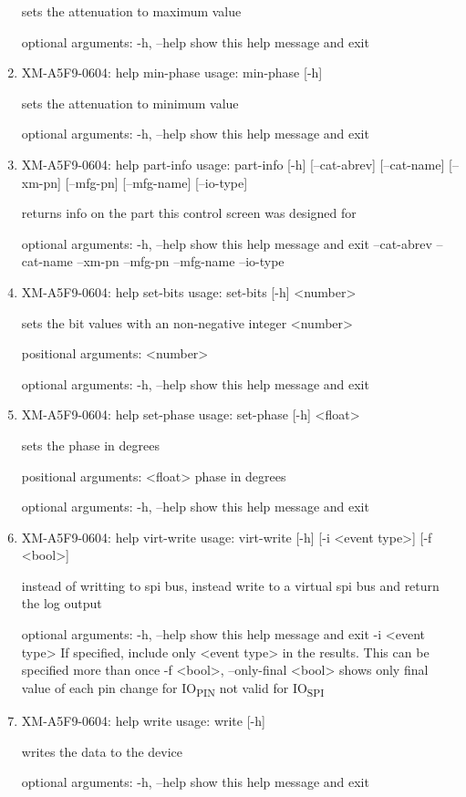 \documentclass[11pt]{article}
\begin{document}
\begin{enumerate}
sets the attenuation to maximum value

optional arguments:
  -h, --help  show this help message and exit

\item XM-A5F9-0604: help min-phase
\label{sec:orgd9fe8ba}
usage: min-phase [-h]

sets the attenuation to minimum value

optional arguments:
  -h, --help  show this help message and exit

\item XM-A5F9-0604: help part-info
\label{sec:org23f64bc}
usage: part-info  [-h] [--cat-abrev] [--cat-name] [--xm-pn] [--mfg-pn] [--mfg-name]
        [--io-type]

returns info on the part this control screen was designed for

optional arguments:
  -h, --help   show this help message and exit
  --cat-abrev
  --cat-name
  --xm-pn
  --mfg-pn
  --mfg-name
  --io-type

\item XM-A5F9-0604: help set-bits
\label{sec:orgb5053be}
usage: set-bits [-h] <number>

sets the bit values with an non-negative integer <number>

positional arguments:
  <number>

optional arguments:
  -h, --help  show this help message and exit

\item XM-A5F9-0604: help set-phase
\label{sec:orga2e561e}
usage: set-phase [-h] <float>

sets the phase in degrees

positional arguments:
  <float>     phase in degrees

optional arguments:
  -h, --help  show this help message and exit

\item XM-A5F9-0604: help virt-write
\label{sec:org40b21d0}
usage: virt-write [-h] [-i <event type>] [-f <bool>]

instead of writting to spi bus, instead write to a virtual spi bus and return
the log output

optional arguments:
  -h, --help            show this help message and exit
  -i <event type>       If specified, include only <event type> in the
                        results. This can be specified more than once
  -f <bool>, --only-final <bool>
                        shows only final value of each pin change for IO\textsubscript{PIN}
                        not valid for IO\textsubscript{SPI}

\item XM-A5F9-0604: help write
\label{sec:org1dac3f4}
usage: write [-h]

writes the data to the device

optional arguments:
  -h, --help  show this help message and exit
\end{enumerate}
\end{document}
